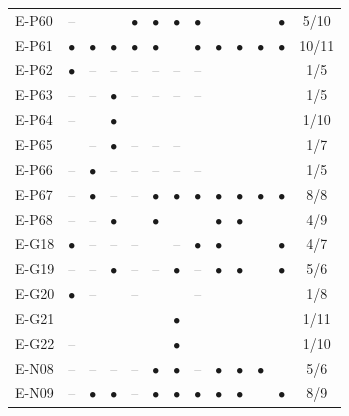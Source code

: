 \begin{longtable}{lccccccccccc c}
    E-P60 & \textcolor{gray}{--} &  &  & $\bullet$ & $\bullet$ & $\bullet$ & $\bullet$ &  &  &  & $\bullet$ & 5/10 \\
    E-P61 & $\bullet$ & $\bullet$ & $\bullet$ & $\bullet$ & $\bullet$ &  & $\bullet$ & $\bullet$ & $\bullet$ & $\bullet$ & $\bullet$ & 10/11 \\
    E-P62 & $\bullet$ & \textcolor{gray}{--} & \textcolor{gray}{--} & \textcolor{gray}{--} & \textcolor{gray}{--} & \textcolor{gray}{--} & \textcolor{gray}{--} &  &  &  &  & 1/5 \\
    E-P63 & \textcolor{gray}{--} & \textcolor{gray}{--} & $\bullet$ & \textcolor{gray}{--} & \textcolor{gray}{--} & \textcolor{gray}{--} & \textcolor{gray}{--} &  &  &  &  & 1/5 \\
    E-P64 & \textcolor{gray}{--} &  & $\bullet$ &  &  &  &  &  &  &  &  & 1/10 \\
    E-P65 &  & \textcolor{gray}{--} & $\bullet$ & \textcolor{gray}{--} & \textcolor{gray}{--} & \textcolor{gray}{--} &  &  &  &  &  & 1/7 \\
    E-P66 & \textcolor{gray}{--} & $\bullet$ & \textcolor{gray}{--} & \textcolor{gray}{--} & \textcolor{gray}{--} & \textcolor{gray}{--} & \textcolor{gray}{--} &  &  &  &  & 1/5 \\
    E-P67 & \textcolor{gray}{--} & $\bullet$ & \textcolor{gray}{--} & \textcolor{gray}{--} & $\bullet$ & $\bullet$ & $\bullet$ & $\bullet$ & $\bullet$ & $\bullet$ & $\bullet$ & 8/8 \\
    E-P68 & \textcolor{gray}{--} & \textcolor{gray}{--} & $\bullet$ &  & $\bullet$ &  &  & $\bullet$ & $\bullet$ &  &  & 4/9 \\
    E-G18 & $\bullet$ & \textcolor{gray}{--} & \textcolor{gray}{--} & \textcolor{gray}{--} &  & \textcolor{gray}{--} & $\bullet$ & $\bullet$ &  &  & $\bullet$ & 4/7 \\
    E-G19 & \textcolor{gray}{--} & \textcolor{gray}{--} & $\bullet$ & \textcolor{gray}{--} & \textcolor{gray}{--} & $\bullet$ & \textcolor{gray}{--} & $\bullet$ & $\bullet$ &  & $\bullet$ & 5/6 \\
    E-G20 & $\bullet$ & \textcolor{gray}{--} &  & \textcolor{gray}{--} &  &  & \textcolor{gray}{--} &  &  &  &  & 1/8 \\
    E-G21 &  &  &  &  &  & $\bullet$ &  &  &  &  &  & 1/11 \\
    E-G22 & \textcolor{gray}{--} &  &  &  &  & $\bullet$ &  &  &  &  &  & 1/10 \\
    E-N08 & \textcolor{gray}{--} & \textcolor{gray}{--} & \textcolor{gray}{--} & \textcolor{gray}{--} & $\bullet$ & $\bullet$ & \textcolor{gray}{--} & $\bullet$ & $\bullet$ & $\bullet$ &  & 5/6 \\
    E-N09 & \textcolor{gray}{--} & $\bullet$ & $\bullet$ & \textcolor{gray}{--} & $\bullet$ & $\bullet$ & $\bullet$ & $\bullet$ & $\bullet$ &  & $\bullet$ & 8/9 \\
\end{longtable}


